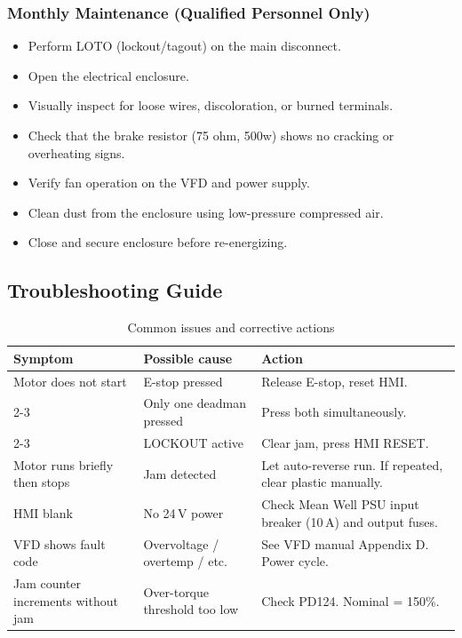 \documentclass[hidelinks,12pt]{article}
\begin{document}
\subsubsection{Monthly Maintenance (Qualified Personnel Only)}
\begin{itemize}
    \item Perform LOTO (lockout/tagout) on the main disconnect.
    \item Open the electrical enclosure.
    \item Visually inspect for loose wires, discoloration, or burned terminals.
    \item Check that the brake resistor (75 ohm, 500w) shows no cracking or overheating signs.
    \item Verify fan operation on the VFD and power supply.
    \item Clean dust from the enclosure using low-pressure compressed air.
    \item Close and secure enclosure before re-energizing.
\end{itemize}

\subsection{Troubleshooting Guide}
\begin{table}[H]
\centering
\caption{Common issues and corrective actions}
\label{tab:troubleshooting}
\begin{tabularx}{\textwidth}{|p{2.8cm}|p{2.5cm}|X|}
\hline
\rowcolor{PSUgreen!12}\textbf{Symptom} & \textbf{Possible cause} & \textbf{Action} \\
\hline
Motor does not start & E-stop pressed & Release E-stop, reset HMI. \\
\cline{2-3}
& Only one deadman pressed & Press both simultaneously. \\
\cline{2-3}
& LOCKOUT active & Clear jam, press HMI RESET. \\
\hline
Motor runs briefly then stops & Jam detected & Let auto-reverse run. If repeated, clear plastic manually. \\
\hline
HMI blank & No 24 V power & Check Mean Well PSU input breaker (10 A) and output fuses. \\
\hline
VFD shows fault code & Overvoltage / overtemp / etc. & See VFD manual Appendix D. Power cycle. \\
\hline
Jam counter increments without jam & Over-torque threshold too low & Check PD124. Nominal = 150\%. \\
\hline
\end{tabularx}
\end{table}
\end{document}
